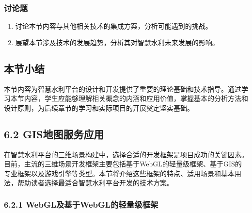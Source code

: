 {\subsubsection{讨论题}\label{ux8ba8ux8bbaux9898-2} \begin{enumerate} \def\labelenumi{\arabic{enumi}.} \tightlist \item
讨论本节内容与其他相关技术的集成方案，分析可能遇到的挑战。 \item 展望本节涉及技术的发展趋势，分析其对智慧水利未来发展的影响。 \end{enumerate}
\subsection{本节小结}\label{ux672cux8282ux5c0fux7ed3-1}
本节内容为智慧水利平台的设计和开发提供了重要的理论基础和技术指导。通过学习本节内容，学生应能够理解相关概念的内涵和应用价值，掌握基本的分析方法和设计原则，为后续章节的学习和实际项目的开展奠定坚实基础。 \subsection{6.2
GIS地图服务应用}\label{gisux5730ux56feux670dux52a1ux5e94ux7528}
在智慧水利平台的三维场景构建中，选择合适的开发框架是项目成功的关键因素。目前，主流的三维场景开发框架主要包括基于WebGL的轻量级框架、基于GIS的专业框架以及游戏引擎等类型。本节将介绍这些框架的特点、适用场景和基本用法，帮助读者选择最适合智慧水利平台开发的技术方案。
\subsubsection{6.2.1 WebGL及基于WebGL的轻量级框架}\label{webglux53caux57faux4e8ewebglux7684ux8f7bux91cfux7ea7ux6846ux67b6}
}
